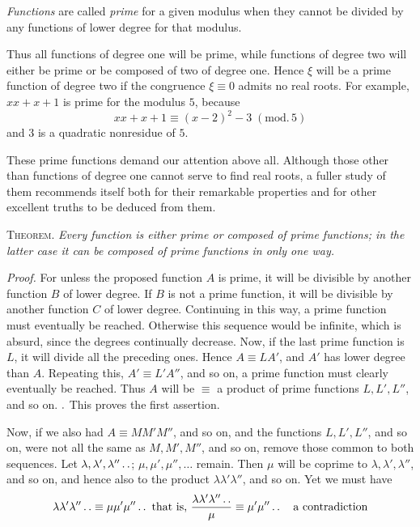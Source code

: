 \emph{Functions} are called \emph{prime} for a given modulus when they cannot be divided by any functions of lower degree for that modulus.

Thus all functions of degree one will be prime, while functions of degree two will either be prime or be composed of two of degree one. Hence $\xi$ will be a prime function of degree two if the congruence $\xi\equiv0$ admits no real roots. For example, $xx+x+1$ is prime for the modulus $5$, because
\[
xx+x+1\equiv(x-2)^2-3\;(\mathrm{mod.}\,5)
\]
and $3$ is a quadratic nonresidue of $5$.

These prime functions demand our attention above all. Although those other than functions of degree one cannot serve to find real roots, a fuller study of them recommends itself both for their remarkable properties and for other excellent truths to be deduced from them.

\textsc{Theorem.} \emph{Every function is either prime or composed of prime functions; in the latter case it can be composed of prime functions in only one way.}

\emph{Proof.} For unless the proposed function $A$ is prime, it will be divisible by another function $B$ of lower degree. If $B$ is not a prime function, it will be divisible by another function $C$ of lower degree. Continuing in this way, a prime function must eventually be reached. Otherwise this sequence would be infinite, which is absurd, since the degrees continually decrease. Now, if the last prime function is $L$, it will divide all the preceding ones. Hence $A\equiv LA'$, and $A'$ has lower degree than $A$. Repeating this, $A'\equiv L'A''$, and so on, a prime function must clearly eventually be reached. Thus $A$ will be $\equiv$ a product of prime functions $L,L',L''$, and so on. $\mathbin{.}$ This proves the first assertion.

Now, if we also had $A\equiv MM'M''$, and so on, and the functions $L,L',L''$, and so on, were not all the same as $M,M',M''$, and so on, remove those common to both sequences.
Let $\lambda,\lambda',\lambda''\mathinner{.\,.}$; $\mu,\mu',\mu'',\ldots$ remain. Then $\mu$ will be coprime to $\lambda,\lambda',\lambda''$, and so on, and hence also to the product $\lambda\lambda'\lambda''$, and so on. Yet we must have
\[
\lambda\lambda'\lambda''\mathinner{.\,.}\equiv\mu\mu'\mu''\mathinner{.\,.}\text{ that is, }\frac{\lambda\lambda'\lambda''\mathinner{.\,.}}{\mu}\equiv\mu'\mu''\mathinner{.\,.}\quad\text{a contradiction}
\]
